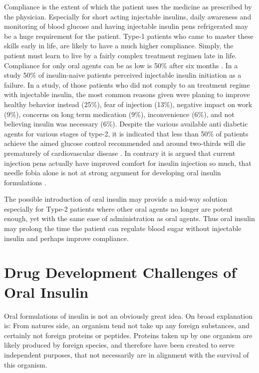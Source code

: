 Compliance is the extent of which the patient uses the medicine as prescribed by the physician. Especially for short acting injectable insulins, daily awareness and monitoring of blood glucose and having injectable insulin pens refrigerated may be a huge requirement for the patient. Type-1 patients who came to master these skills early in life, are likely to have a much higher compliance. Simply, the patient must learn to live by a fairly complex treatment regimen late in life. Compliance for only oral agents can be as low is 50\% after six months \cite{garcia2013adherence}. In a study 50\% of insulin-naive patients perceived injectable insulin initiation as a failure. In a study, of those patients who did not comply to an treatment regime with injectable insulin, the most common reasons given were planing to improve healthy behavior instead (25\%), fear of injection (13\%), negative impact on work (9\%), concerns on long term medication (9\%), inconvenience (6\%), and not believing insulin was necessary (6\%). Despite the various available anti diabetic agents for various stages of type-2, it is indicated that less than 50\% of patients achieve the aimed glucose control recommended and around two-thirds will die prematurely of cardiovascular disease \cite{garcia2013adherence}. In contrary it is argued that current injection pens actually have improved comfort for insulin injection so much, that needle fobia alone is not at strong argument for developing oral insulin formulations \cite{maher2014formulation}.

The possible introduction of oral insulin may provide a mid-way solution especially for Type-2 patients where other oral agents no longer are potent enough, yet with the same ease of administration as oral agents. Thus oral insulin may prolong the time the patient can regulate blood sugar without injectable insulin and perhaps improve compliance.

\section{Drug Development Challenges of Oral Insulin}
Oral formulations of insulin is not an obviously great idea. On broad explanation is: From natures side, an organism tend not take up any foreign substances, and certainly not foreign proteins or peptides. Proteins taken up by one organism are likely produced by foreign species, and therefore have been created to serve independent purposes, that not necessarily are in alignment with the survival of this organism.

